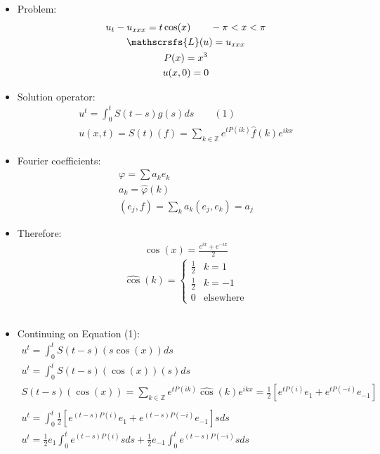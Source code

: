 \documentclass[12pt, a4paper]{article}
\begin{document}
\begin{itemize}
    \item Problem:
    \begin{gather*}
        u_t - u_{xxx} = t\cos(x) \qquad -\pi < x< \pi\\
        \mathscrsfs{L}(u) = u_{xxx}\\
        P(x) = x^3\\
        u(x, 0)=0
    \end{gather*}
    \item Solution operator:
    \begin{gather*}
        u^t = \int_0^t S(t-s)g(s)ds \qquad (1)\\
        u(x, t) = S(t)(f) =\sum_{k \in \mathbb{Z}} e^{tP(ik)}\hat{f}(k)e^{ikx}
    \end{gather*}
    \item Fourier coefficients:
    \begin{gather*}
        \varphi = \sum a_k e_k\\
        a_k = \hat{\varphi}(k) \\
        (e_j, f) = \sum_k a_k (e_j, e_k) = a_j
    \end{gather*}
    \item Therefore:
    \begin{gather*}
        \cos(x) =\frac{e^{ix}+e^{-ix}}{2}
    \end{gather*}
    \[\widehat{\cos}(k) = \begin{cases}
        \frac{1}{2} & k = 1\\
        \frac{1}{2} & k = -1\\
        0 & \text{elsewhere}
    \end{cases}\]\\
    \item Continuing on Equation (1):
    \begin{gather*}
        u^t = \int_0^t S(t-s)(s\cos(x))ds \\
        u^t = \int_0^t S(t-s)(\cos(x))(s)ds \\
        S(t-s)(\cos(x)) = \sum_{k \in \mathbb{Z}} e^{tP(ik)}\widehat{\cos}(k)e^{ikx} = \frac{1}{2}\left[e^{tP(i)}e_1 + e^{tP(-i)}e_{-1}\right]\\\\
        u^t = \int_0^t \frac{1}{2}\left[e^{(t-s)P(i)}e_1 + e^{(t-s)P(-i)}e_{-1}\right]sds\\
        u^t = \frac{1}{2}e_1\int_0^t e^{(t-s)P(i)}sds + \frac{1}{2}e_{-1}\int_0^t e^{(t-s)P(-i)}sds\\

\end{gather*}
\end{itemize}
\end{document}
